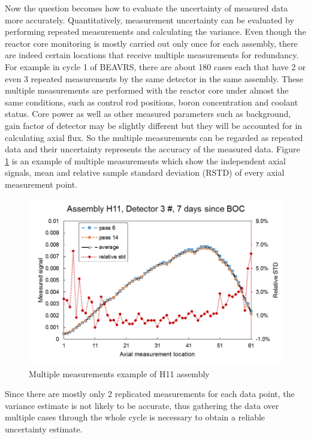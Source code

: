 \documentclass{article}
\begin{document}
Now the question becomes how to evaluate the uncertainty of measured data more accurately. Quantitatively, measurement uncertainty can be evaluated by performing repeated measurements and calculating the variance. Even though the reactor core monitoring is mostly carried out only once for each assembly, there are indeed certain locations that receive multiple measurements for redundancy. For example in cycle 1 of BEAVRS, there are about 180 cases each that have 2 or even 3 repeated measurements by the same detector in the same assembly. These multiple measurements are performed with the reactor core under almost the same conditions, such as control rod positions, boron concentration and coolant status. Core power as well as other measured parameters such as background, gain factor of detector may be slightly different but they will be accounted for in calculating axial flux. So the multiple measurements can be regarded as repeated data and their uncertainty represents the accuracy of the measured data. Figure \ref{fig:fig_multi_measure_H11}  is an example of multiple measurements which show the independent axial signals, mean and relative sample standard deviation (RSTD) of every axial measurement point.

\begin{figure}[ht]
\centering
\includegraphics[keepaspectratio, width = 4.0 in]{figures/flux_map_uncertainties/Multi-Measurements-H11}
\caption{Multiple measurements example of H11 assembly}
\label{fig:fig_multi_measure_H11}
\end{figure}

Since there are mostly only 2 replicated measurements for each data point, the variance estimate is not likely to be accurate, thus gathering the data over multiple cases through the whole cycle is necessary to obtain a reliable uncertainty estimate.
\end{document}
